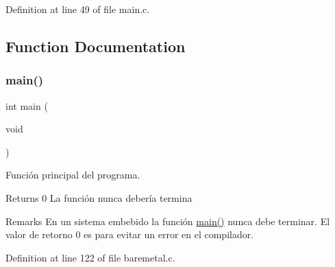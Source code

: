 Definition at line 49 of file main.\+c.



\subsection{Function Documentation}
\mbox{\label{group__samples_ga840291bc02cba5474a4cb46a9b9566fe}} 
\subsubsection{\texorpdfstring{main()}{main()}}
{\footnotesize\ttfamily int main (\begin{DoxyParamCaption}\item[{void}]{ }\end{DoxyParamCaption})}



Función principal del programa. 

\begin{DoxyReturn}{Returns}
0 La función nunca debería termina
\end{DoxyReturn}
\begin{DoxyRemark}{Remarks}
En un sistema embebido la función \hyperlink{group__samples_ga840291bc02cba5474a4cb46a9b9566fe}{main()} nunca debe terminar. El valor de retorno 0 es para evitar un error en el compilador. 
\end{DoxyRemark}


Definition at line 122 of file baremetal.\+c.

